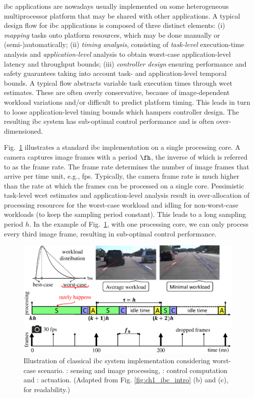 \Gls{ibc} applications are nowadays usually implemented on some heterogeneous multiprocessor platform that may be shared with other applications.
A typical design flow for \gls{ibc} applications is composed of three distinct elements: (i) \emph{mapping} tasks onto platform resources, which may be done manually or (semi-)automati\-cally; (ii) \emph{timing analysis}, consisting of \emph{task-level} execution-time analysis and \emph{app\-lication-level} analysis to obtain worst-case application-level latency and throughput bounds; (iii) \emph{controller design} ensuring performance and safety guarantees taking into account task- and application-level temporal bounds. A typical flow abstracts variable task execution times through \gls{wcet} estimates. These are often overly conservative, because of image-dependent workload variations and/or difficult to predict platform timing. This leads in turn to loose application-level timing bounds which hampers controller design. The resulting \gls{ibc} system has sub-optimal control performance and is often over-dimensioned.

Fig.\ \ref{fig:ch5_intro} illustrates a standard \gls{ibc} implementation on a single processing core.
A camera captures image frames with a period $\fh$, the inverse of which is referred to as the frame rate. 
The frame rate determines the number of image frames that arrive per time unit, e.g., \gls{fps}.
Typically, the camera frame rate is much higher than the rate at which the frames can be processed on a single core.
Pessimistic task-level \gls{wcet} estimates and  application-level analysis result in over-allocation of processing resources for the worst-case workload and idling for non-worst-case workloads (to keep the sampling period constant). This leads to a long sampling period $h$. 
In the example of Fig.\ \ref{fig:ch5_intro}, with one processing core, we can only process every third image frame, resulting in sub-optimal control performance.

\begin{figure}
\vspace*{-1.5ex}\centerline{\includegraphics[width=\textwidth]{images/intro.eps}}
\vspace*{-2ex}
\caption{Illustration of classical \gls{ibc} system implementation considering worst-case
scenario. \taskS: sensing and image processing, \taskC: control
computation and \taskA: actuation. (Adapted from Fig. \ref{fig:ch1_ibc_intro} (b) and (c), for readability.)}
\label{fig:ch5_intro}
\end{figure}

